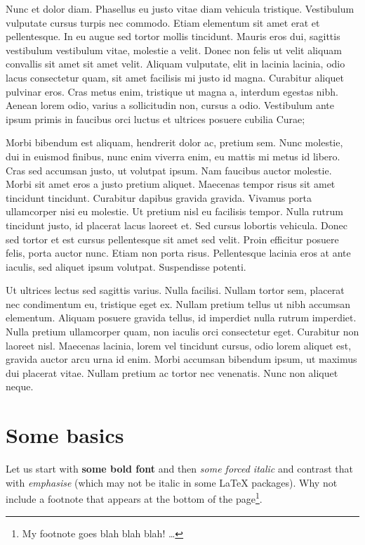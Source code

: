 Nunc et dolor diam. Phasellus eu justo vitae diam vehicula tristique. Vestibulum vulputate cursus turpis nec commodo. Etiam elementum sit amet erat et pellentesque. In eu augue sed tortor mollis tincidunt. Mauris eros dui, sagittis vestibulum vestibulum vitae, molestie a velit. Donec non felis ut velit aliquam convallis sit amet sit amet velit. Aliquam vulputate, elit in lacinia lacinia, odio lacus consectetur quam, sit amet facilisis mi justo id magna. Curabitur aliquet pulvinar eros. Cras metus enim, tristique ut magna a, interdum egestas nibh. Aenean lorem odio, varius a sollicitudin non, cursus a odio. Vestibulum ante ipsum primis in faucibus orci luctus et ultrices posuere cubilia Curae;

Morbi bibendum est aliquam, hendrerit dolor ac, pretium sem. Nunc molestie, dui in euismod finibus, nunc enim viverra enim, eu mattis mi metus id libero. Cras sed accumsan justo, ut volutpat ipsum. Nam faucibus auctor molestie. Morbi sit amet eros a justo pretium aliquet. Maecenas tempor risus sit amet tincidunt tincidunt. Curabitur dapibus gravida gravida. Vivamus porta ullamcorper nisi eu molestie. Ut pretium nisl eu facilisis tempor. Nulla rutrum tincidunt justo, id placerat lacus laoreet et. Sed cursus lobortis vehicula. Donec sed tortor et est cursus pellentesque sit amet sed velit. Proin efficitur posuere felis, porta auctor nunc. Etiam non porta risus. Pellentesque lacinia eros at ante iaculis, sed aliquet ipsum volutpat. Suspendisse potenti.

Ut ultrices lectus sed sagittis varius. Nulla facilisi. Nullam tortor sem, placerat nec condimentum eu, tristique eget ex. Nullam pretium tellus ut nibh accumsan elementum. Aliquam posuere gravida tellus, id imperdiet nulla rutrum imperdiet. Nulla pretium ullamcorper quam, non iaculis orci consectetur eget. Curabitur non laoreet nisl. Maecenas lacinia, lorem vel tincidunt cursus, odio lorem aliquet est, gravida auctor arcu urna id enim. Morbi accumsan bibendum ipsum, ut maximus dui placerat vitae. Nullam pretium ac tortor nec venenatis. Nunc non aliquet neque.

\section{Some basics}

Let us start with \textbf{some bold font} and then \textit{some forced italic} and contrast that with \emph{emphasise} (which may not be italic in some \LaTeX{} packages). Why not include a footnote that appears at the bottom of the page\footnote{My footnote goes blah blah blah! \dots}.


